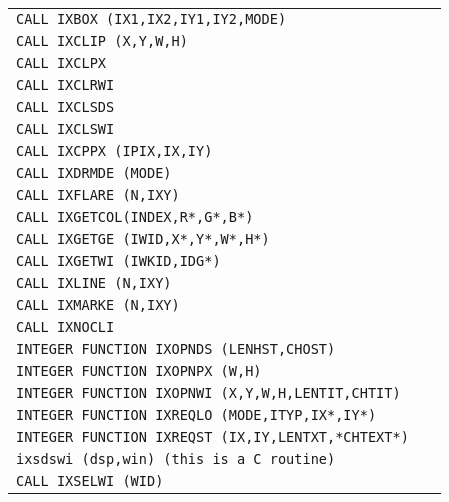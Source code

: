 \begin{longtable}{|>{\small\tt}p{.87\linewidth}r|}
\hline
CALL IXBOX (IX1,IX2,IY1,IY2,MODE)                     & \pageref{IXBOX}       \\
CALL IXCLIP (X,Y,W,H)                                 & \pageref{IXCLIP}      \\
CALL IXCLPX                                           & \pageref{IXCLPX}      \\
CALL IXCLRWI                                          & \pageref{IXCLRWI}     \\
CALL IXCLSDS                                          & \pageref{IXCLSDS}     \\
CALL IXCLSWI                                          & \pageref{IXCLSWI}     \\
CALL IXCPPX (IPIX,IX,IY)                              & \pageref{IXCPPX}      \\
CALL IXDRMDE (MODE)                                   & \pageref{IXDRMDE}     \\
CALL IXFLARE (N,IXY)                                  & \pageref{IXFLARE}     \\
CALL IXGETCOL(INDEX,R*,G*,B*)                         & \pageref{IXGETCOL}    \\
CALL IXGETGE (IWID,X*,Y*,W*,H*)                       & \pageref{IXGETGE}     \\
CALL IXGETWI (IWKID,IDG*)                             & \pageref{IXGETWI}     \\
CALL IXLINE (N,IXY)                                   & \pageref{IXLINE}      \\
CALL IXMARKE (N,IXY)                                  & \pageref{IXMARKE}     \\
CALL IXNOCLI                                          & \pageref{IXNOCLI}     \\
INTEGER FUNCTION IXOPNDS (LENHST,CHOST)               & \pageref{IXOPNDS}     \\
INTEGER FUNCTION IXOPNPX (W,H)                        & \pageref{IXOPNPX}     \\
INTEGER FUNCTION IXOPNWI (X,Y,W,H,LENTIT,CHTIT)       & \pageref{IXOPNWI}     \\
INTEGER FUNCTION IXREQLO (MODE,ITYP,IX*,IY*)          & \pageref{IXREQLO}     \\
INTEGER FUNCTION IXREQST (IX,IY,LENTXT,*CHTEXT*)      & \pageref{IXREQST}     \\
ixsdswi (dsp,win) ({\rm this is a C routine})         & \pageref{ixsdswi}     \\
CALL IXSELWI (WID)                                    & \pageref{IXSELWI}     \\

\end{longtable}

